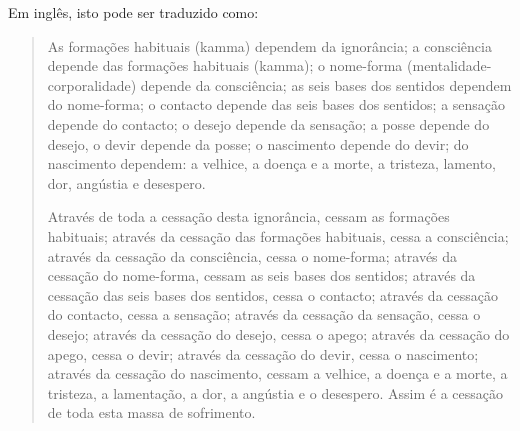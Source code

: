 Em inglês, isto pode ser traduzido como:

\begin{quote}
  As formações habituais (kamma) dependem da ignorância; a consciência depende
  das formações habituais (kamma); o nome-forma (mentalidade-corporalidade)
  depende da consciência; as seis bases dos sentidos dependem do nome-forma; o
  contacto depende das seis bases dos sentidos; a sensação depende do contacto;
  o desejo depende da sensação; a posse depende do desejo, o devir depende da
  posse; o nascimento depende do devir; do nascimento dependem: a velhice, a
  doença e a morte, a tristeza, lamento, dor, angústia e desespero.

  Através de toda a cessação desta ignorância, cessam as formações habituais;
  através da cessação das formações habituais, cessa a consciência; através da
  cessação da consciência, cessa o nome-forma; através da cessação do
  nome-forma, cessam as seis bases dos sentidos; através da cessação das seis
  bases dos sentidos, cessa o contacto; através da cessação do contacto, cessa a
  sensação; através da cessação da sensação, cessa o desejo; através da cessação
  do desejo, cessa o apego; através da cessação do apego, cessa o devir; através
  da cessação do devir, cessa o nascimento; através da cessação do nascimento,
  cessam a velhice, a doença e a morte, a tristeza, a lamentação, a dor, a
  angústia e o desespero. Assim é a cessação de toda esta massa de sofrimento.
\end{quote}

